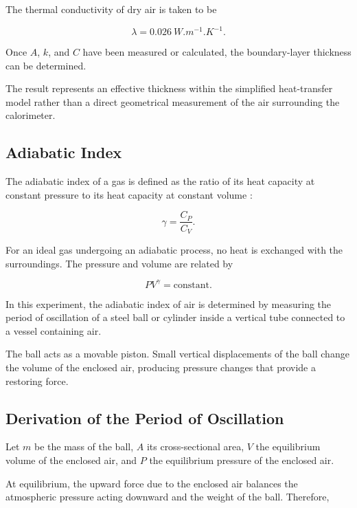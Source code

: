 \documentclass[12pt,a4paper]{article}
\begin{document}
The thermal conductivity of dry air is taken to be

\begin{equation}
    \lambda=\SI{0.026}{W.m^{-1}.K^{-1}}.
\end{equation}

Once $A$, $k$, and $C$ have been measured or calculated, the
boundary-layer thickness can be determined.

The result represents an effective thickness within the simplified
heat-transfer model rather than a direct geometrical measurement
of the air surrounding the calorimeter.

\subsection{Adiabatic Index}

The adiabatic index of a gas is defined as the ratio of its
heat capacity at constant pressure to its heat capacity at
constant volume \cite{py2107}:

\begin{equation}
    \boxed{\gamma=\frac{C_P}{C_V}}.
\end{equation}

For an ideal gas undergoing an adiabatic process, no heat is
exchanged with the surroundings. The pressure and volume are
related by

\begin{equation}
    \boxed{PV^\gamma=\text{constant}}.
    \label{eq:adiabatic}
\end{equation}

In this experiment, the adiabatic index of air is determined by
measuring the period of oscillation of a steel ball or cylinder
inside a vertical tube connected to a vessel containing air.

The ball acts as a movable piston. Small vertical displacements
of the ball change the volume of the enclosed air, producing
pressure changes that provide a restoring force.

\subsection{Derivation of the Period of Oscillation}

Let $m$ be the mass of the ball, $A$ its cross-sectional area,
$V$ the equilibrium volume of the enclosed air, and $P$ the
equilibrium pressure of the enclosed air.

At equilibrium, the upward force due to the enclosed air balances
the atmospheric pressure acting downward and the weight of the
ball. Therefore,
\end{document}
